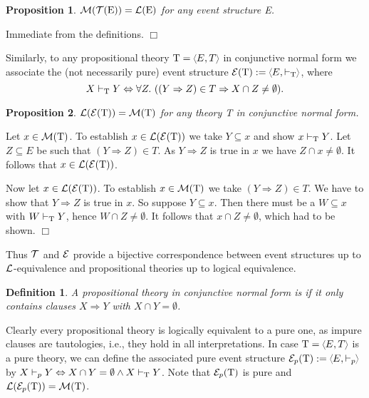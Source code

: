 \documentclass[twocolumn]{article}
\newtheorem{defi}{Definition}[section]
\newtheorem{prop}{Proposition}[section]
\newenvironment{definition}[1]{\begin{defi} \rm \label{df-#1} }{\end{defi}}
\newenvironment{proposition}[1]{\begin{prop} \rm \label{pr-#1} }{\end{prop}}
\newenvironment{proof}{\begin{trivlist} \item[\hspace{\labelsep}\bf
Proof:]}{\hfill $\Box$\end{trivlist}}
\newcommand{\phrase}[1]{\index{#1}{\em #1}}		\newcommand{\implies}{\Rightarrow}
\newcommand{\turn}{\vdash}                              \newcommand{\dbigcup}{\bigcup_{\uparrow}}		\newcommand{\nbigcup}{\bigcup_{\bullet}}		\newcommand{\nbigcap}{\bigcap_{\bullet}}		\newcommand{\bbigcup}{\overline{\bigcup}}		\newcommand{\bbigcap}{\overline{\bigcap}}		\newcommand{\nbbigcap}{\bbigcap_{\bullet}}		\newcommand{\fbbigcup}{\overline{\bigcup}^f}		\newcommand{\bbbigcup}{\overline{\bigcup}^2}		\newcommand{\dcup}{~~\makebox[0pt]{\LARGE$\cdot$}\makebox[0pt]{$\cup$}~~}
\begin{document}
\begin{proposition}{EtoT} ${\cal M}({\cal T}({\rm E})) = {\cal L}({\rm E})$ for any event
structure E.
\end{proposition}

\begin{proof}
Immediate from the definitions.
\end{proof}
Similarly, to any propositional theory $\eT=\tuple{E,T}$ in conjunctive
normal form we associate the (not necessarily pure) event structure
$\fE(\eT) := \tuple{E,\turn_\eT\;}$, where
$$X \turn_\eT Y \Leftrightarrow \forall Z.~ ((Y \implies Z) \in T
\Rightarrow X \cap Z \neq \emptyset).$$

\begin{proposition}{TtoE} ${\cal L}({\cal E}({\rm T})) = {\cal M}({\rm T})$ for any theory T
in conjunctive normal form.
\end{proposition}

\begin{proof}
Let $x \in {\cal M}({\rm T})$. To establish $x\in{\cal L}({\cal E}({\rm T}))$ we take $Y
\subseteq x$ and show $x\turn_\eT Y$. Let $Z \subseteq E$ be such that
$(Y \Rightarrow Z) \in T$. As $Y \Rightarrow Z$ is true in $x$ we have
$Z \cap x \neq \emptyset$. It follows that $x \in {\cal L}({\cal E}({\rm T}))$.

Now let $x \in {\cal L}({\cal E}({\rm T}))$. To establish $x\in{\cal M}({\rm T})$ we take $(Y
\Rightarrow Z) \in T$.  We have to show that $Y \Rightarrow Z$ is true
in $x$. So suppose $Y \subseteq x$.  Then there must be a $W \subseteq
x$ with $W \turn_\eT Y$, hence $W \cap Z \neq \emptyset$. It follows
that $x \cap Z \neq \emptyset$, which had to be shown.
\end{proof}
Thus ${\cal T}$ and ${\cal E}$ provide a bijective correspondence between event
structures up to ${\cal L}$-equivalence and propositional theories up to
logical equivalence.

\begin{definition}{pure PT}
A propositional theory in conjunctive normal form is \phrase{pure} if it
only contains clauses $X \implies Y$ with $X \cap Y = \emptyset$.
\end{definition}
Clearly every propositional theory is logically equivalent to a pure one, as
impure clauses are tautologies, i.e., they hold in all interpretations.
In case $\eT=\tuple{E,T}$ is a pure theory, we can define the
associated pure event structure $\fE_p(\eT) := \tuple{E,\turn_p\;}$ by
$X \turn_p Y \Leftrightarrow X \cap Y = \emptyset \wedge X \turn_\eT Y$.
Note that ${\cal E}_p({\rm T})$ is pure and ${\cal L}({\cal E}_p({\rm T})) = {\cal M}({\rm T})$.
\end{document}
